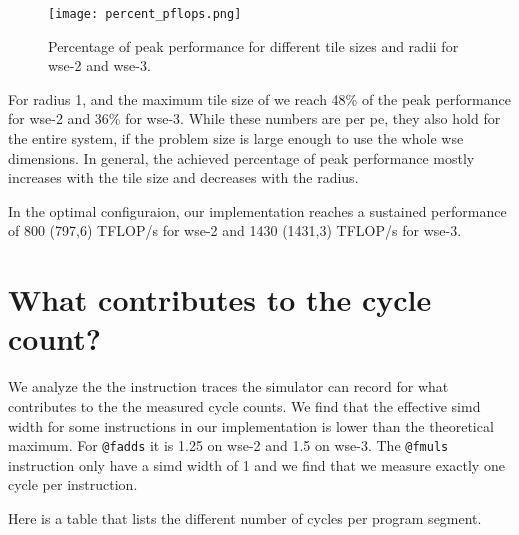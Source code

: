 \begin{figure}[h]
    \centering
    \texttt{[image: percent\_pflops.png]}
    \caption{Percentage of peak performance for different tile sizes and radii for \ac{wse}-2 and \ac{wse}-3.}
    \label{fig:percent_pflops}
\end{figure}

For radius 1, and the maximum tile size of  we reach \num{48}\% of the peak performance for \ac{wse}-2 and \num{36}\% for \ac{wse}-3.
While these numbers are per \ac{pe}, they also hold for the entire system, if the problem size is large enough to use the whole \ac{wse} dimensions.
In general, the achieved percentage of peak performance mostly increases with the tile size and decreases with the radius.

In the optimal configuraion, our implementation reaches a sustained performance of 800 (797,6) TFLOP/s for \ac{wse}-2 and 1430 (1431,3) TFLOP/s for \ac{wse}-3.

\section{What contributes to the cycle count?}
We analyze the the instruction traces the simulator can record for what contributes to the the measured cycle counts.
We find that the effective simd width for some instructions in our implementation is lower than the theoretical maximum.
For \texttt{@fadds} it is 1.25 on wse-2 and 1.5 on wse-3.
The \texttt{@fmuls} instruction only have a simd width of 1 and we find that we measure exactly one cycle per instruction.

Here is a table that lists the different number of cycles per program segment. 